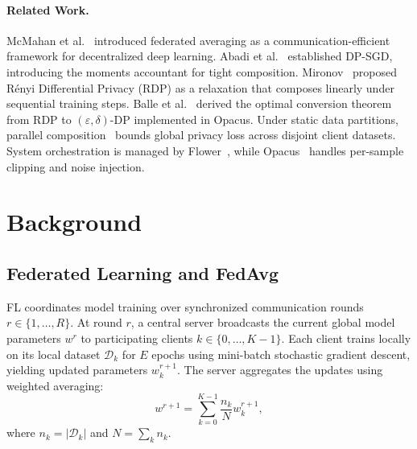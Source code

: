 \documentclass[11pt,a4paper]{article}
\begin{document}
\paragraph{Related Work.}
McMahan et al.~\cite{mcmahan2017} introduced federated averaging as a communication-efficient framework for decentralized deep learning. Abadi et al.~\cite{abadi2016} established DP-SGD, introducing the moments accountant for tight composition. Mironov~\cite{mironov2017} proposed R{\'e}nyi Differential Privacy (RDP) as a relaxation that composes linearly under sequential training steps. Balle et al.~\cite{balle2020} derived the optimal conversion theorem from RDP to $(\varepsilon, \delta)$-DP implemented in Opacus. Under static data partitions, parallel composition~\cite{mcsherry2009} bounds global privacy loss across disjoint client datasets. System orchestration is managed by Flower~\cite{flower}, while Opacus~\cite{opacus} handles per-sample clipping and noise injection.

\section{Background}

\subsection{Federated Learning and FedAvg}
FL coordinates model training over synchronized communication rounds $r \in \{1, \dots, R\}$. At round $r$, a central server broadcasts the current global model parameters $w^r$ to participating clients $k \in \{0, \dots, K-1\}$. Each client trains locally on its local dataset $\mathcal{D}_k$ for $E$ epochs using mini-batch stochastic gradient descent, yielding updated parameters $w_k^{r+1}$. The server aggregates the updates using weighted averaging:
\begin{equation}
    w^{r+1} = \sum_{k=0}^{K-1} \frac{n_k}{N} w_k^{r+1},
\end{equation}
where $n_k = |\mathcal{D}_k|$ and $N = \sum_k n_k$.
\end{document}
